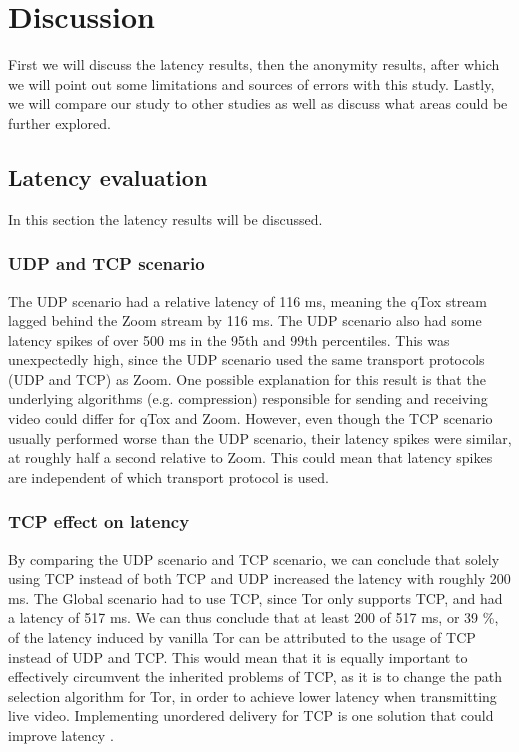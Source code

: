 \documentclass{kththesis}
\begin{document}
\chapter{Discussion}
First we will discuss the latency results, then the anonymity results, after which we will point out some limitations and sources of errors with this study. Lastly, we will compare our study to other studies as well as discuss what areas could be further explored. 

\section{Latency evaluation}
In this section the latency results will be discussed.

\subsection{UDP and TCP scenario}
The UDP scenario had a relative latency of 116 ms, meaning the qTox stream lagged behind the Zoom stream by 116 ms. The UDP scenario also had some latency spikes of over 500 ms in the 95th and 99th percentiles. This was unexpectedly high, since the UDP scenario used the same transport protocols (UDP and TCP) as Zoom. One possible explanation for this result is that the underlying algorithms (e.g. compression) responsible for sending and receiving video could differ for qTox and Zoom. However, even though the TCP scenario usually performed worse than the UDP scenario, their latency spikes were similar, at roughly half a second relative to Zoom. This could mean that latency spikes are independent of which transport protocol is used.

\subsection{TCP effect on latency}
By comparing the UDP scenario and TCP scenario, we can conclude that solely using TCP instead of both TCP and UDP increased the latency with roughly 200 ms. The Global scenario had to use TCP, since Tor only supports TCP, and had a latency of 517 ms. We can thus conclude that at least 200 of 517 ms, or 39 \%, of the latency induced by vanilla Tor can be attributed to the usage of TCP instead of UDP and TCP. This would mean that it is equally important to effectively circumvent the inherited problems of TCP, as it is to change the path selection algorithm for Tor, in order to achieve lower latency when transmitting live video. Implementing unordered delivery for TCP is one solution that could improve latency \parencite{unorderedTCPdelivery}. 
\end{document}
